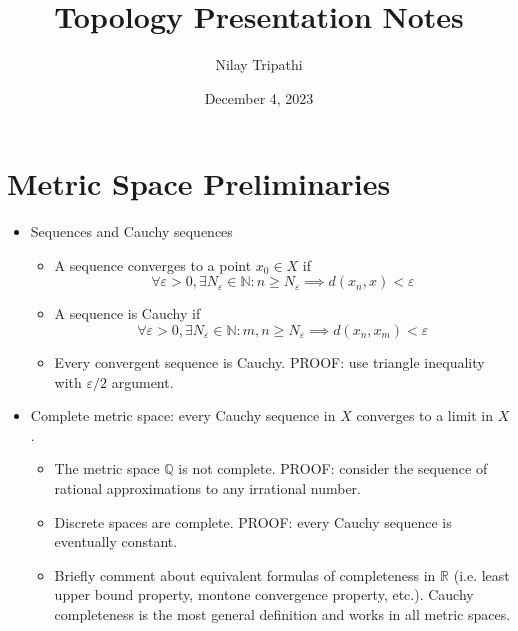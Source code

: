 \documentclass{article}
\title{Topology Presentation Notes}
\author{Nilay Tripathi }
\date{December 4, 2023}
\newcommand{\R}{\mathbb{R}}
\newcommand{\Q}{\mathbb{Q}}
\newcommand{\N}{\mathbb{N}}
\theoremstyle{plain}
\theoremstyle{definition}
\begin{document}
    \maketitle
		
		\section{Metric Space Preliminaries}
		\begin{itemize}
				\item Sequences and Cauchy sequences 
						\begin{itemize}
								\item A sequence converges to a point $x_0\in X$ if 
										\begin{equation*}
												\forall \varepsilon > 0, \exists N_{\varepsilon} \in \N : n\geq N_{\varepsilon} \implies d(x_n, x) < \varepsilon
										\end{equation*}

								\item A sequence is Cauchy if 
										\begin{equation*}
												\forall \varepsilon > 0, \exists N_{\varepsilon} \in \N : m,n \geq N_{\varepsilon} \implies d(x_n, x_m) < \varepsilon
										\end{equation*}

								\item Every convergent sequence is Cauchy. PROOF: use triangle inequality with $\varepsilon / 2$ argument. 
						\end{itemize}

				\item Complete metric space: every Cauchy sequence in $X$ converges to a limit in $X$. 
						\begin{itemize}
								\item The metric space $\Q$ is not complete. PROOF: consider the sequence of rational approximations to any irrational number. 
								\item Discrete spaces are complete. PROOF: every Cauchy sequence is eventually constant. 
								\item Briefly comment about equivalent formulas of completeness in $\R$ (i.e. least upper bound property, montone convergence property, etc.). Cauchy completeness is the most general definition and works in all metric spaces.
						\end{itemize}
		\end{itemize}
\end{document}
